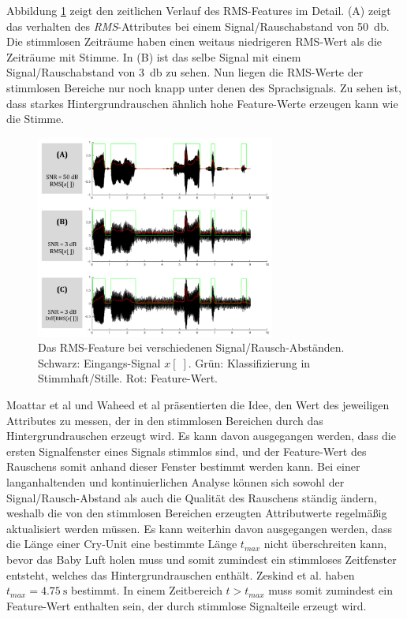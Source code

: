 Abbildung \ref{img:min-signal} zeigt den zeitlichen Verlauf des RMS-Features im Detail. (A) zeigt das verhalten des \emph{RMS}-Attributes bei einem Signal/Rauschabstand von \SI{50}{\decibel}. Die stimmlosen Zeiträume haben einen weitaus niedrigeren RMS-Wert als die Zeiträume mit Stimme. In (B) ist das selbe Signal mit einem Signal/Rauschabstand von \SI{3}{\decibel} zu sehen. Nun liegen die RMS-Werte der stimmlosen Bereiche nur noch knapp unter denen des Sprachsignals. Zu sehen ist, dass starkes Hintergrundrauschen ähnlich hohe Feature-Werte erzeugen kann wie die Stimme.

\begin{figure}[h]
	\centering
	\includegraphics[width=0.7\textwidth]{bilder/rms_diff.png}
	\caption{Das RMS-Feature bei verschiedenen Signal/Rausch-Abständen. Schwarz: Eingangs-Signal $x[\;]$. Grün: Klassifizierung in Stimmhaft/Stille. Rot: Feature-Wert.}
	\label{img:min-signal}
\end{figure}

Moattar et al \cite{vad_Easy} und Waheed et al \cite{vad_entropy} präsentierten die Idee, den Wert des jeweiligen Attributes zu messen, der in den stimmlosen Bereichen durch das Hintergrundrauschen erzeugt wird. Es kann davon ausgegangen werden, dass die ersten Signalfenster eines Signals stimmlos sind, und der Feature-Wert des Rauschens somit anhand dieser Fenster bestimmt werden kann. Bei einer langanhaltenden und kontinuierlichen Analyse können sich sowohl der Signal/Rausch-Abstand als auch die Qualität des Rauschens ständig ändern, weshalb die von den stimmlosen Bereichen erzeugten Attributwerte regelmäßig aktualisiert werden müssen. Es kann weiterhin davon ausgegangen werden, dass die Länge einer Cry-Unit eine bestimmte Länge $t_{max}$ nicht überschreiten kann, bevor das Baby Luft holen muss und somit zumindest ein stimmloses Zeitfenster entsteht, welches das Hintergrundrauschen enthält. Zeskind et al. \cite[S. 325]{rythmic} haben $t_{max} = \SI{4.75}{\second}$ bestimmt. In einem Zeitbereich $ t > t_{max}$ muss somit zumindest ein Feature-Wert enthalten sein, der durch stimmlose Signalteile erzeugt wird. 

